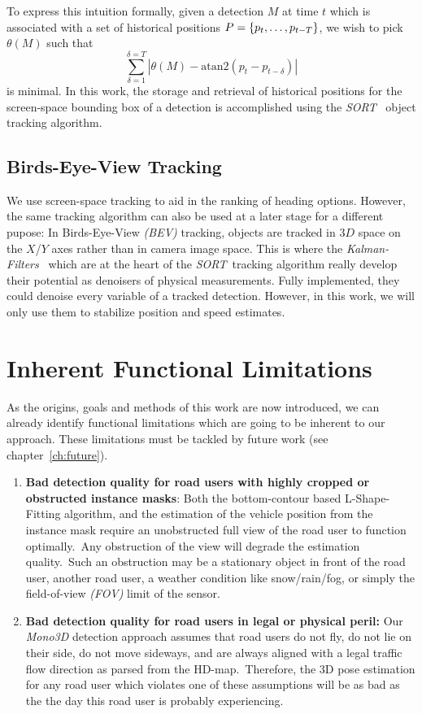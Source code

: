 To express this intuition formally, given a detection $M$ at time $t$ which is associated with a set of historical positions $P=\{p_{t},\mathellipsis,p_{t-T}\}$, we wish to pick $\theta(M)$ such that \[\sum_{\delta=1}^{\delta=T} |\theta(M) - \text{atan2}(p_t - p_{t-\delta})|\] is minimal.
In this work, the storage and retrieval of historical positions for the screen-space bounding box of a detection is accomplished using the \textit{SORT}~\cite{bewley2016simple} object tracking algorithm.

\subsection{Birds-Eye-View Tracking}
\label{subsec:bevtracking}

We use screen-space tracking to aid in the ranking of heading options.
However, the same tracking algorithm can also be used at a later stage for a different pupose:
In Birds-Eye-View \textit{(BEV)} tracking, objects are tracked in $3D$ space on the $X$/$Y$ axes rather than in camera image space.
This is where the \textit{Kalman-Filters}~\cite{welch1995kalman} which are at the heart of the \textit{SORT}~tracking algorithm really develop their potential as denoisers of physical measurements.
Fully implemented, they could denoise every variable of a tracked detection.
However, in this work, we will only use them to stabilize position and speed estimates.

\section{Inherent Functional Limitations}
\label{sec:limits}

As the origins, goals and methods of this work are now introduced, we can already identify functional limitations which are going to be inherent to our approach.
These limitations must be tackled by future work (see chapter~\ref{ch:future}).

\begin{enumerate}
    \item \textbf{Bad detection quality for road users with highly cropped or obstructed instance masks}: Both the bottom-contour based L-Shape-Fitting algorithm, and the estimation of the vehicle position from the instance mask require an unobstructed full view of the road user to function optimally.\ Any obstruction of the view will degrade the estimation quality.\ Such an obstruction may be a stationary object in front of the road user, another road user, a weather condition like snow/rain/fog, or simply the field-of-view \textit{(FOV)} limit of the sensor.
    \item \textbf{Bad detection quality for road users in legal or physical peril:} Our \textit{Mono3D} detection approach assumes that road users do not fly, do not lie on their side, do not move sideways, and are always aligned with a legal traffic flow direction as parsed from the HD-map.\ Therefore, the 3D pose estimation for any road user which violates one of these assumptions will be as bad as the the day this road user is probably experiencing.
\end{enumerate}


